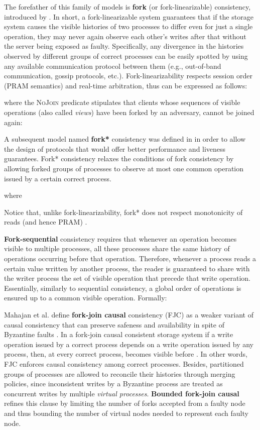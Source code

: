 \documentclass[letter, 11pt]{article}
\newcommand{\citeN}{\citet}
\renewcommand{\cite}{\citep}
\begin{document}
The forefather of this family of models is \textbf{fork} (or fork-linearizable) consistency,
introduced by \citeN{Mazieres.Shasha:02}.
In short, a fork-linearizable system guarantees that if the storage system causes the visible histories of two
processes to differ even for just a single operation, they may never again observe each other's 
writes after that without the server being exposed as faulty.
Specifically, any divergence in the histories observed by different groups of correct processes
can be easily spotted by using any available communication protocol between them
(e.g., out-of-band communication, gossip protocols, etc.). Fork-linearizability respects session order (\textsc{PRAM} semantics) and real-time arbitration, thus can be expressed as follows:

\noindent where the \textsc{NoJoin} predicate stipulates that clients whose sequences of visible operations (also called \emph{views}) have been forked by an adversary, cannot be joined again:



A subsequent model named \textbf{fork*} consistency was defined in \cite{Li.Mazieres:07} 
in order to allow the design of protocols that would offer better performance and liveness guarantees.
Fork* consistency relaxes the conditions of fork consistency 
by allowing forked groups of processes to observe at most one common 
operation issued by a certain correct process.

\noindent where

Notice that, unlike fork-linearizability, fork* does not respect monotonicity of reads (and hence \textsc{PRAM}) \cite{Cachin.Keidar.ea:11}.

\textbf{Fork-sequential} consistency \cite{Oprea.Reiter:06,Cachin.Keidar.ea:09a} requires that 
whenever an operation becomes visible to multiple processes, 
all these processes share the same history of operations occurring before that operation.
Therefore, whenever a process reads a certain value written by another process,
the reader is guaranteed to share with the writer process the set of visible operation that precede that write operation.
Essentially, similarly to sequential consistency, a global order of operations is ensured
up to a common visible operation. Formally:


Mahajan et al. define \textbf{fork-join causal} consistency (FJC) as a
weaker variant of causal consistency that can preserve safeness and availability in spite of Byzantine faults \cite{Mahajan.Setty.ea:10}.
In a fork-join causal consistent storage system if a write operation  issued by a correct process 
depends on a write operation  issued by any process, then, at every correct process,  becomes visible before .
In other words, FJC enforces causal consistency among correct processes.
Besides, partitioned groups of processes are allowed to reconcile their histories through merging policies,
since inconsistent writes by a Byzantine process are treated as 
concurrent writes by multiple \emph{virtual processes}.
\textbf{Bounded fork-join causal} \cite{P-Mahajan.Dahlin:11} refines this clause by limiting
the number of forks accepted from a faulty node and thus bounding the number of virtual nodes
needed to represent each faulty node.
\end{document}
